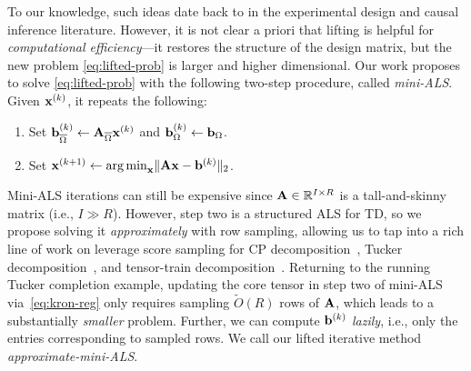 To our knowledge, such ideas date back to \citet{healy1956missing} in the experimental design and causal inference literature.
However, it is not clear a priori that lifting is helpful for \emph{computational efficiency}---it restores the structure of the design matrix,
but the new problem \eqref{eq:lifted-prob} is larger and higher dimensional.
Our work proposes to solve \eqref{eq:lifted-prob} with the following two-step procedure,
called \emph{mini-ALS}.
Given $\mathbf{x}^{(k)}$, it repeats the following:
\begin{enumerate}
    \item Set $\mathbf{b}^{(k)}_{\overline{\Omega}} \gets \mathbf{A}_{\overline{\Omega}} \mathbf{x}^{(k)}$ and $\mathbf{b}^{(k)}_{\Omega} \gets \mathbf{b}_{\Omega}$.
    \item Set $\mathbf{x}^{(k+1)} \gets \operatorname*{arg\,min}_{\mathbf{x}} \lVert\mathbf{A} \mathbf{x} - \mathbf{b}^{(k)}\rVert_{2}$.
\end{enumerate}

Mini-ALS iterations can still be expensive since ${\mathbf{A} \in \mathbb{R}^{I \times R}}$ is a tall-and-skinny matrix (i.e., $I\gg R$).
However, step two is a structured ALS for TD,
so we propose solving it \emph{approximately} with row sampling,
allowing us to tap into a rich line of work on leverage score sampling
for CP decomposition~\citep{cheng2016spals,larsen2022practical,bharadwaj2023fast},
Tucker decomposition~\citep{diao2019optimal,fahrbach2022subquadratic},
and tensor-train decomposition~\citep{bharadwaj2024efficient}.
Returning to the running Tucker completion example,
updating the core tensor in step two of mini-ALS via~\eqref{eq:kron-reg}
only requires sampling $\tilde{O}(R)$ rows of $\mathbf{A}$,
which leads to a substantially \emph{smaller} problem.
Further, we can compute $\mathbf{b}^{(k)}$ \emph{lazily}, i.e.,
only the entries corresponding to sampled rows.
We call our lifted iterative method \emph{approximate-mini-ALS}.

